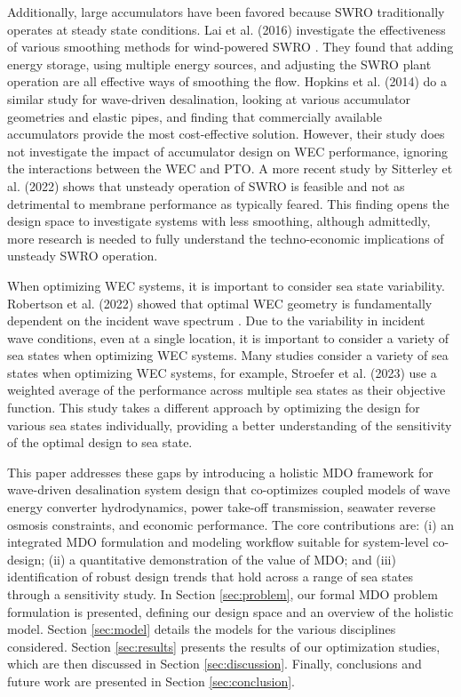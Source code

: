 \documentclass[a4paper,12pt]{elsarticle}
\begin{document}
Additionally, large accumulators have been favored because SWRO traditionally operates at steady state conditions. Lai et al. (2016) investigate the effectiveness of various smoothing methods for wind-powered SWRO \cite{Lai2016}. They found that adding energy storage, using multiple energy sources, and adjusting the SWRO plant operation are all effective ways of smoothing the flow. Hopkins et al. (2014) do a similar study for wave-driven desalination, looking at various accumulator geometries and elastic pipes, and finding that commercially available accumulators provide the most cost-effective solution\cite{Hopkins2014}. However, their study does not investigate the impact of accumulator design on WEC performance, ignoring the interactions between the WEC and PTO. A more recent study by Sitterley et al. (2022) \cite{Sitterley2022} shows that unsteady operation of SWRO is feasible and not as detrimental to membrane performance as typically feared. This finding opens the design space to investigate systems with less smoothing, although admittedly, more research is needed to fully understand the techno-economic implications of unsteady SWRO operation.

When optimizing WEC systems, it is important to consider sea state variability. Robertson et al. (2022) showed that optimal WEC geometry is fundamentally dependent on the incident wave spectrum \cite{Robertson2022}. Due to the variability in incident wave conditions, even at a single location, it is important to consider a variety of sea states when optimizing WEC systems. Many studies consider a variety of sea states when optimizing WEC systems, for example, Stroefer et al. (2023) \cite{Stroefer2023} use a weighted average of the performance across multiple sea states as their objective function. This study takes a different approach by optimizing the design for various sea states individually, providing a better understanding of the sensitivity of the optimal design to sea state. 

This paper addresses these gaps by introducing a holistic MDO framework for wave-driven desalination system design that co-optimizes coupled models of wave energy converter hydrodynamics, power take-off transmission, seawater reverse osmosis constraints, and economic performance. The core contributions are: (i) an integrated MDO formulation and modeling workflow suitable for system-level co-design; (ii) a quantitative demonstration of the value of MDO; and (iii) identification of robust design trends that hold across a range of sea states through a sensitivity study. In Section \ref{sec:problem}, our formal MDO problem formulation is presented, defining our design space and an overview of the holistic model. Section \ref{sec:model} details the models for the various disciplines considered. Section \ref{sec:results} presents the results of our optimization studies, which are then discussed in Section \ref{sec:discussion}. Finally, conclusions and future work are presented in Section \ref{sec:conclusion}.
\end{document}
